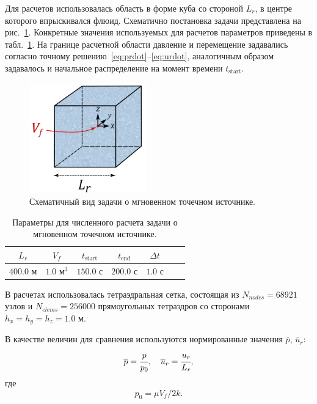 Для расчетов использовалась область в форме куба со стороной $L_r$,
в центре которого впрыскивался флюид. Схематично постановка задачи представлена на рис.~\ref{fig:immdot}.
Конкретные значения используемых для расчетов параметров приведены в табл.~\ref{tab:immdot}.
На границе расчетной области давление и перемещение задавались согласно 
точному решению~\eqref{eq:prdot}--\eqref{eq:urdot}, аналогичным образом
задавалось и начальное распределение на момент времени $t_{\text{start}}$.
%
\begin{figure}[h!]
\centering
\includegraphics[width=0.45\textwidth]{./figs/immdot.png}
\caption{Схематичный вид задачи о мгновенном точечном источнике.}\label{fig:immdot}
\end{figure}
% 
%
\begin{table}[h!]
\centering
%
\renewcommand{\arraystretch}{1.5}
\renewcommand{\tabcolsep}{6 pt} 
\begin{tabular}{|c|c|c|c|c|c|c|}
\hline
$L_r$ & $V_f$ & $t_{\text{start}}$ & $t_{\text{end}}$ & $\Delta t$\\
\hline
 $400.0$ м & $1.0 \text{ м}^3$ & $150.0$ с & $200.0$ с & $1.0$ с\\
\hline
\end{tabular}
%
\caption{Параметры для численного расчета задачи о мгновенном точечном источнике.}\label{tab:immdot}
\end{table}
%
 

В расчетах использовалась тетраэдральная сетка, состоящая из 
$N_{nodes} = 68921$ узлов и $N_{elems} = 256000$ прямоугольных тетраэдров со сторонами $h_x = h_y = h_z = 1.0$ м.

В качестве величин для сравнения используются нормированные значения $\overline{p}$, $\overline{u}_r$:
%
\begin{equation*}
%
\overline{p} = \cfrac{p}{p_0}, \quad \overline{u}_r = \cfrac{u_r}{L_r},
%
\end{equation*}
%
где 
\begin{equation}
\label{eq:p0p0}
p_0 = \mu V_f / 2 k.
\end{equation}

